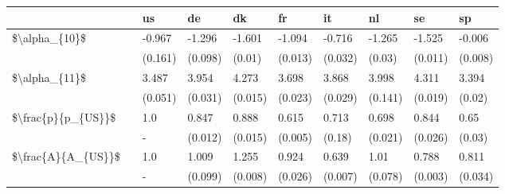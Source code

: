 \begin{tabular}{llllllllll}
\toprule
                   & {} &       us &       de &       dk &       fr &       it &       nl &       se &       sp \\
\midrule
\$\textbackslash alpha\_\{10\}\$ & {} &   -0.967 &   -1.296 &   -1.601 &   -1.094 &   -0.716 &   -1.265 &   -1.525 &   -0.006 \\
                   & {} &  (0.161) &  (0.098) &   (0.01) &  (0.013) &  (0.032) &   (0.03) &  (0.011) &  (0.008) \\
\$\textbackslash alpha\_\{11\}\$ & {} &    3.487 &    3.954 &    4.273 &    3.698 &    3.868 &    3.998 &    4.311 &    3.394 \\
                   & {} &  (0.051) &  (0.031) &  (0.015) &  (0.023) &  (0.029) &  (0.141) &  (0.019) &   (0.02) \\
\$\textbackslash frac\{p\}\{p\_\{US\}\}\$ & {} &      1.0 &    0.847 &    0.888 &    0.615 &    0.713 &    0.698 &    0.844 &     0.65 \\
                   & {} &        - &  (0.012) &  (0.015) &  (0.005) &   (0.18) &  (0.021) &  (0.026) &   (0.03) \\
\$\textbackslash frac\{A\}\{A\_\{US\}\}\$ & {} &      1.0 &    1.009 &    1.255 &    0.924 &    0.639 &     1.01 &    0.788 &    0.811 \\
                   & {} &        - &  (0.099) &  (0.008) &  (0.026) &  (0.007) &  (0.078) &  (0.003) &  (0.034) \\
\bottomrule
\end{tabular}
